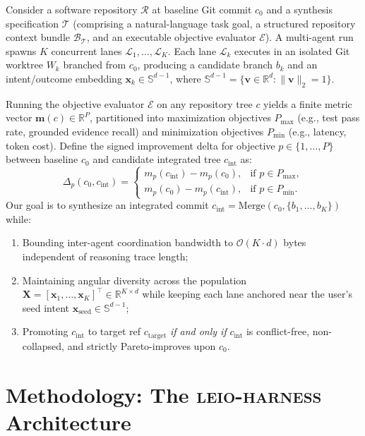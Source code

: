 \documentclass[11pt]{article}
\begin{document}
Consider a software repository $\mathcal{R}$ at baseline Git commit $c_0$ and a synthesis specification $\mathcal{T}$ (comprising a natural-language task goal, a structured repository context bundle $\mathcal{B}_{\mathcal{T}}$, and an executable objective evaluator $\mathcal{E}$). A multi-agent run spawns $K$ concurrent lanes $\mathcal{L}_1, \dots, \mathcal{L}_K$. Each lane $\mathcal{L}_k$ executes in an isolated Git worktree $W_k$ branched from $c_0$, producing a candidate branch $b_k$ and an intent/outcome embedding $\mathbf{x}_k \in \mathbb{S}^{d-1}$, where $\mathbb{S}^{d-1} = \{\mathbf{v} \in \mathbb{R}^d : \|\mathbf{v}\|_2 = 1\}$.

Running the objective evaluator $\mathcal{E}$ on any repository tree $c$ yields a finite metric vector $\mathbf{m}(c) \in \mathbb{R}^P$, partitioned into maximization objectives $P_{\max}$ (e.g., test pass rate, grounded evidence recall) and minimization objectives $P_{\min}$ (e.g., latency, token cost). Define the signed improvement delta for objective $p \in \{1, \dots, P\}$ between baseline $c_0$ and candidate integrated tree $c_{\text{int}}$ as:
\begin{equation}
\label{eq:signed-delta}
\Delta_p(c_0, c_{\text{int}}) =
\begin{cases}
m_p(c_{\text{int}}) - m_p(c_0), & \text{if } p \in P_{\max}, \\[4pt]
m_p(c_0) - m_p(c_{\text{int}}), & \text{if } p \in P_{\min}.
\end{cases}
\end{equation}
Our goal is to synthesize an integrated commit $c_{\text{int}} = \text{Merge}(c_0, \{b_1, \dots, b_K\})$ while:
\begin{enumerate}
    \item Bounding inter-agent coordination bandwidth to $\mathcal{O}(K \cdot d)$ bytes independent of reasoning trace length;
    \item Maintaining angular diversity across the population $\mathbf{X} = [\mathbf{x}_1, \dots, \mathbf{x}_K]^\top \in \mathbb{R}^{K \times d}$ while keeping each lane anchored near the user's seed intent $\mathbf{x}_{\text{seed}} \in \mathbb{S}^{d-1}$;
    \item Promoting $c_{\text{int}}$ to target ref $c_{\text{target}}$ \emph{if and only if} $c_{\text{int}}$ is conflict-free, non-collapsed, and strictly Pareto-improves upon $c_0$.
\end{enumerate}

\section{Methodology: The \textsc{leio-harness} Architecture}
\end{document}
